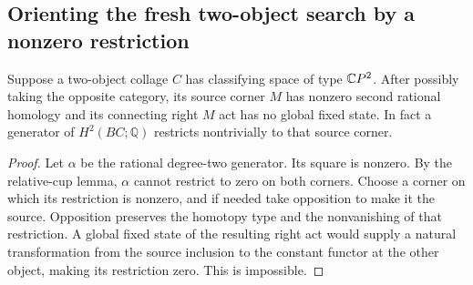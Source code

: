 \subsection{Orienting the fresh two-object search by a nonzero restriction}

\begin{lemma}
\label{CP2:A-two-object-positive-orientation}
Suppose a two-object collage $C$ has classifying space
of type $\mathbb{C}P^2$. After possibly taking the opposite
category, its source corner $M$ has nonzero second
rational homology and its connecting right $M$ act has
no global fixed state. In fact a generator of
$H^2(BC;\mathbb Q)$ restricts nontrivially to that source
corner.
\end{lemma}
\begin{proof}
Let $\alpha$ be the rational degree-two generator.
Its square is nonzero. By the relative-cup lemma,
$\alpha$ cannot restrict to zero on both corners.
Choose a corner on which its restriction is nonzero,
and if needed take opposition to make it the source.
Opposition preserves the homotopy type and the
nonvanishing of that restriction. A global fixed state
of the resulting right act would supply a natural
transformation from the source inclusion to the constant
functor at the other object, making its restriction zero.
This is impossible.
\end{proof}

